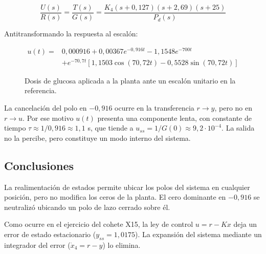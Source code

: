 \documentclass[12pt,a4paper]{article}
\begin{document}
\begin{equation}\frac{U(s)}{R(s)}=\frac{T(s)}{G(s)}=\frac{K_4(s+0{,}127)(s+2{,}69)(s+25)}{P_d(s)}\end{equation}

Antitransformando la respuesta al escalón:

\begin{equation}\begin{aligned}u(t)={}&0{,}000916+0{,}00367e^{-0{,}916t}-1{,}1548e^{-700t}\\&+e^{-70{,}7t}\left[1{,}1503\cos(70{,}72t)-0{,}5528\sin(70{,}72t)\right]\end{aligned}\end{equation}

\begin{figure}[H]\centering{}\caption{Dosis de glucosa aplicada a la planta ante un escalón unitario en la referencia.}\end{figure}

La cancelación del polo en $-0{,}916$ ocurre en la transferencia $r\rightarrow y$, pero no en $r\rightarrow u$. Por ese motivo $u(t)$ presenta una componente lenta, con constante de tiempo $\tau\approx1/0{,}916\approx1{,}1$ s, que tiende a $u_{ss}=1/G(0)\approx9{,}2\cdot10^{-4}$. La salida no la percibe, pero constituye un modo interno del sistema.
\subsection*{Conclusiones}
La realimentación de estados permite ubicar los polos del sistema en cualquier posición, pero no modifica los ceros de la planta. El cero dominante en $-0{,}916$ se neutralizó ubicando un polo de lazo cerrado sobre él.

Como ocurre en el ejercicio del cohete X15, la ley de control $u=r-Kx$ deja un error de estado estacionario ($y_{ss}=1{,}0175$). La expansión del sistema mediante un integrador del error ($\dot{x}_4=r-y$) lo elimina.
\end{document}
